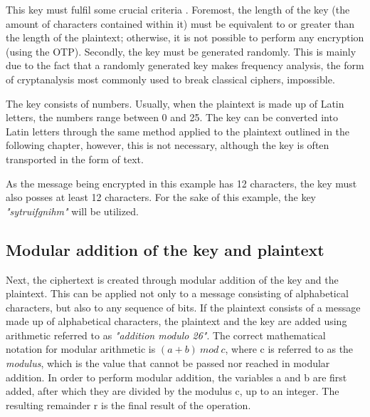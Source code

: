 \documentclass[12pt]{report}
\theoremstyle{definition}
\theoremstyle{remark}
\begin{document}
This key must fulfil some crucial criteria \cite{MilsElectronic}. Foremost, the length of the key (the amount of  characters contained within it) must be equivalent to or greater than the length of the plaintext; otherwise, it is not possible to perform any encryption (using the OTP). Secondly, the key must be generated randomly. This is mainly due to the fact that a randomly generated key makes frequency analysis\cite{FrequencyAnalysis}, the form of cryptanalysis most commonly used to break classical ciphers, impossible.


The key consists of numbers. Usually, when the plaintext is made up of Latin letters, the numbers range between 0 and 25. The key can be converted into Latin letters through the same method applied to the plaintext outlined in the following chapter, however, this is not necessary, although the key is often transported in the form of text.

As the message being encrypted in this example has 12 characters, the key must also posses at least 12 characters. For the sake of this example, the key \textit{"sytruifgnihm"} will be utilized.

\subsection{Modular addition of the key and plaintext}



Next, the ciphertext is created through modular addition of the key and the plaintext. This can be applied not only to a message consisting of alphabetical characters, but also to any sequence of bits. If the plaintext consists of a message made up of alphabetical characters, the plaintext and the key are added using arithmetic referred to as \textit{"addition modulo 26"}. The correct mathematical notation for modular arithmetic is $(a+b)\:mod\:c$, where c is referred to as the \textit{modulus}, which is the value that cannot be passed nor reached in modular addition. In order to perform modular addition, the variables a and b are first added, after which they are divided by the modulus c, up to an integer. The resulting remainder r is the final result of the operation.
\end{document}

